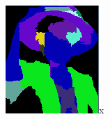 \begin{figure}[htb!]
\begin{subfigure}{0.24\textwidth}
\includegraphics[width=\textwidth]{images/luffy_match1.png}x
\end{subfigure}
\begin{subfigure}{0.24\textwidth}

\end{subfigure}
\end{figure}
